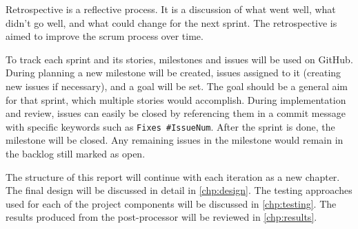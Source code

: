 Retrospective is a reflective process. It is a discussion of what went well, what didn't go well, and what could change for the next sprint. The retrospective is aimed to improve the scrum process over time.

To track each sprint and its stories, milestones and issues will be used on GitHub\cite{GitHubMilestones}. During planning a new milestone will be created, issues assigned to it (creating new issues if necessary), and a goal will be set. The goal should be a general aim for that sprint, which multiple stories would accomplish. During implementation and review, issues can easily be closed by referencing them in a commit message with specific keywords such as \texttt{Fixes \#IssueNum}\cite{GitHubCloseIssueCommit}. After the sprint is done, the milestone will be closed. Any remaining issues in the milestone would remain in the backlog still marked as open.

The structure of this report will continue with each iteration as a new chapter. The final design will be discussed in detail in \autoref{chp:design}. The testing approaches used for each of the project components will be discussed in \autoref{chp:testing}. The results produced from the post-processor will be reviewed in \autoref{chp:results}.
